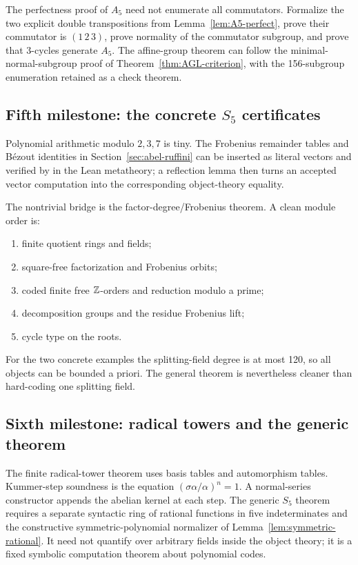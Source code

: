 The perfectness proof of \(A_5\) need not enumerate all commutators.  Formalize
the two explicit double transpositions from Lemma~\ref{lem:A5-perfect}, prove
their commutator is \((1\,2\,3)\), prove normality of the commutator subgroup,
and prove that 3-cycles generate \(A_5\).  The affine-group theorem can follow
the minimal-normal-subgroup proof of Theorem~\ref{thm:AGL-criterion}, with the
156-subgroup enumeration retained as a check theorem.

\subsection{Fifth milestone: the concrete \(S_5\) certificates}

Polynomial arithmetic modulo \(2,3,7\) is tiny.  The Frobenius remainder tables
and Bézout identities in Section~\ref{sec:abel-ruffini} can be inserted as
literal vectors and verified by  in the Lean metatheory;
a reflection lemma then turns an accepted vector computation into the
corresponding object-theory equality.

The nontrivial bridge is the factor-degree/Frobenius theorem.  A clean module
order is:

\begin{enumerate}
\item finite quotient rings and fields;
\item square-free factorization and Frobenius orbits;
\item coded finite free \(\mathbb Z\)-orders and reduction modulo a prime;
\item decomposition groups and the residue Frobenius lift;
\item cycle type on the roots.
\end{enumerate}

For the two concrete examples the splitting-field degree is at most 120, so all
objects can be bounded a priori.  The general theorem is nevertheless cleaner
than hard-coding one splitting field.

\subsection{Sixth milestone: radical towers and the generic theorem}

The finite radical-tower theorem uses basis tables and automorphism tables.
Kummer-step soundness is the equation
\((\sigma\alpha/\alpha)^n=1\).  A normal-series constructor appends the abelian
kernel at each step.  The generic \(S_5\) theorem requires a separate syntactic
ring of rational functions in five indeterminates and the constructive
symmetric-polynomial normalizer of Lemma~\ref{lem:symmetric-rational}.  It need
not quantify over arbitrary fields inside the object theory; it is a fixed
symbolic computation theorem about polynomial codes.

